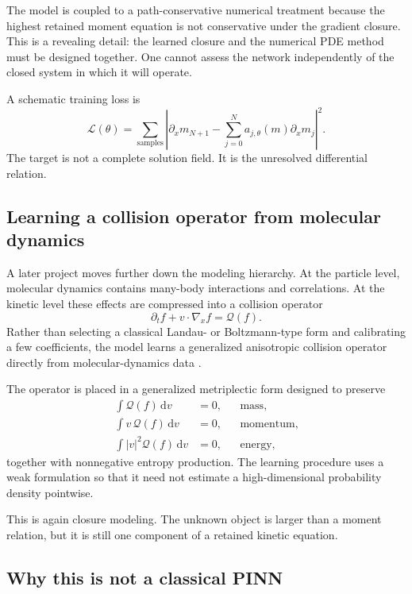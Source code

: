 \documentclass[11pt]{article}
\newcommand{\dd}{\,\mathrm{d}}
\begin{document}
The model is coupled to a path-conservative numerical treatment because the highest retained moment equation is not conservative under the gradient closure. This is a revealing detail: the learned closure and the numerical PDE method must be designed together. One cannot assess the network independently of the closed system in which it will operate.

A schematic training loss is
\begin{equation}
 \mathcal{L}(\theta)
 =\sum_{\text{samples}}
 \left|
 \partial_xm_{N+1}
 -\sum_{j=0}^{N}a_{j,\theta}(m)\partial_xm_j
 \right|^2.
\end{equation}
The target is not a complete solution field. It is the unresolved differential relation.

\subsection{Learning a collision operator from molecular dynamics}

A later project moves further down the modeling hierarchy. At the particle level, molecular dynamics contains many-body interactions and correlations. At the kinetic level these effects are compressed into a collision operator
\begin{equation}
 \partial_t f+v\cdot\nabla_xf=\mathcal{Q}(f).
\end{equation}
Rather than selecting a classical Landau- or Boltzmann-type form and calibrating a few coefficients, the model learns a generalized anisotropic collision operator directly from molecular-dynamics data \citep{zhao2025collision}.

The operator is placed in a generalized metriplectic form designed to preserve
\begin{align*}
 \int \mathcal{Q}(f)\dd v&=0,
 &&\text{mass},\\
 \int v\,\mathcal{Q}(f)\dd v&=0,
 &&\text{momentum},\\
 \int |v|^2\mathcal{Q}(f)\dd v&=0,
 &&\text{energy},
\end{align*}
together with nonnegative entropy production. The learning procedure uses a weak formulation so that it need not estimate a high-dimensional probability density pointwise.

This is again closure modeling. The unknown object is larger than a moment relation, but it is still one component of a retained kinetic equation.

\subsection{Why this is not a classical PINN}
\end{document}
